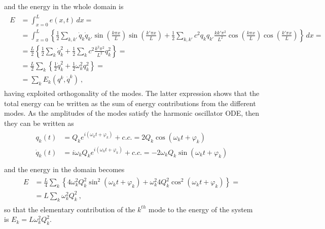 \documentclass[letterpaper,10pt,english]{jupyterBook}
\begin{document}
\sphinxAtStartPar
and the energy in the whole domain is
\begin{equation*}
\begin{split}\begin{aligned}
 E 
 & = \int_{x=0}^{L} e(x,t) \, dx = \\
 & = \int_{x=0}^{L} \left\{ \frac{1}{2} \sum_{k, k'} \dot{q}_k \dot{q}_{k'} \sin\left( \frac{k \pi x}{L}\right) \sin\left( \frac{k' \pi x}{L} \right) + \frac{1}{2} \sum_{k,k'} c^2 q_k q_{k'} \frac{k k' \pi^2}{L^2} \cos \left( \frac{k \pi x}{L} \right) \cos \left( \frac{k' \pi x}{L} \right) \right\} \, dx = \\
 & = \frac{L}{2} \left\{ \frac{1}{2} \sum_{k} \dot{q}_k^2 + \frac{1}{2} \sum_{k} c^2 \frac{k^2 \pi^2}{L^2} q_k^2 \right\}  = \\
 & = \frac{L}{2} \sum_{k} \left\{ \frac{1}{2} \dot{q}_k^2 + \frac{1}{2} \omega_k^2 q_k^2 \right\}  = \\
 & = \sum_{k} E_k(q^k, \dot{q}^k) \ ,
\end{aligned}\end{split}
\end{equation*}
\sphinxAtStartPar
having exploited orthogonality of the modes. The latter expression shows that the total energy can be written as the sum of energy contributions from the different modes. As the amplitudes of the modes satisfy the harmonic oscillator ODE, then they can be written as
\begin{equation*}
\begin{split}\begin{aligned}
  q_k(t)       & = Q_k e^{i ( \omega_k t + \varphi_k)} + c.c. = 2 Q_k \cos( \omega_k t + \varphi_k ) \\
  \dot{q}_k(t) & = i \omega_k Q_k e^{i (\omega_k t + \varphi_k)} + c.c. = - 2 \omega_k Q_k \sin( \omega_k t + \varphi_k ) \\
\end{aligned}\end{split}
\end{equation*}
\sphinxAtStartPar
and the energy in the domain becomes
\begin{equation*}
\begin{split}\begin{aligned}
  E
  & = \frac{L}{4} \sum_k \left\{ 4 \omega_k^2 Q_k^2 \sin^2( \omega_k t + \varphi_k ) + \omega_k^2 4 Q_k^2 \cos^2( \omega_k t + \varphi_k ) \right\} = \\
  & = L \sum_k \omega_k^2 Q_k^2 \ ,
\end{aligned}\end{split}
\end{equation*}
\sphinxAtStartPar
so that the elementary contribution of the \(k^{th}\) mode to the energy of the system is \(E_k = L \omega^2_k Q_k^2\).
\end{document}
